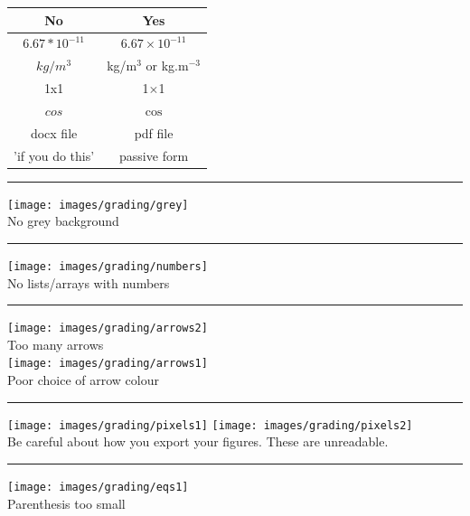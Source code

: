 \begin{center}
\begin{tabular}{cc}
\hline
No & Yes \\
\hline
\hline
$6.67*10^{-11}$ & $6.67 \times 10^{-11}$ \\
$kg/m^3$ &  kg/m$^{3}$ or kg.m$^{-3}$\\
1x1 & 1$\times$1\\
$cos$ & $\cos$\\
docx file & pdf file \\
'if you do this'& passive form \\ 
\hline
\end{tabular}
\end{center}




\par\noindent\rule{\textwidth}{0.4pt}
\begin{center}
\texttt{[image: images/grading/grey]}\\
No grey background
\end{center}


\par\noindent\rule{\textwidth}{0.4pt}
\begin{center}
\texttt{[image: images/grading/numbers]}\\
No lists/arrays with numbers
\end{center}

\par\noindent\rule{\textwidth}{0.4pt}
\begin{center}
\texttt{[image: images/grading/arrows2]}\\
Too many arrows\\
\texttt{[image: images/grading/arrows1]}\\
Poor choice of arrow colour
\end{center}

\par\noindent\rule{\textwidth}{0.4pt}
\begin{center}
\texttt{[image: images/grading/pixels1]}
\texttt{[image: images/grading/pixels2]}\\
Be careful about how you export your figures. These are unreadable.
\end{center}
 
\par\noindent\rule{\textwidth}{0.4pt}
\begin{center}
\texttt{[image: images/grading/eqs1]}\\
Parenthesis too small
\end{center}

